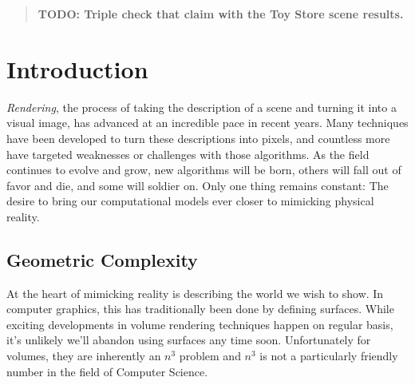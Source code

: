 \documentclass[12pt]{ucthesis}
\begin{document}
\begin{frontmatter}
\begin{abstract}
\textbf{TODO: Triple check that claim with the Toy Store scene results.}

\end{abstract}





\tableofcontents


\listoftables

\listoffigures

\end{frontmatter}

\pagestyle{plain}




\renewcommand{\baselinestretch}{1.66}







\chapter{Introduction}
\label{intro}

\emph{Rendering}, the process of taking the description of a scene and turning
it into a visual image, has advanced at an incredible pace in recent
years. Many techniques have been developed to turn these descriptions into
pixels, and countless more have targeted weaknesses or challenges with those
algorithms. As the field continues to evolve and grow, new algorithms will be
born, others will fall out of favor and die, and some will soldier on. Only
one thing remains constant: The desire to bring our computational models ever
closer to mimicking physical reality.

\section{Geometric Complexity}
\label{complexity}

At the heart of mimicking reality is describing the world we wish to show. In
computer graphics, this has traditionally been done by defining surfaces. While
exciting developments in volume rendering techniques happen on regular basis,
it's unlikely we'll abandon using surfaces any time soon. Unfortunately for
volumes, they are inherently an $n^3$ problem and $n^3$ is not a particularly
friendly number in the field of Computer Science.
\end{document}
